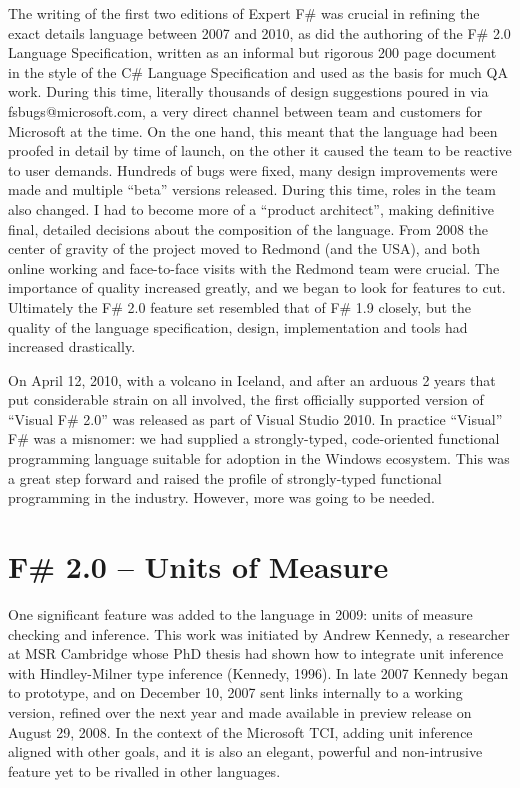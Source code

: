 \documentclass[acmsmall,review]{acmart}\settopmatter{printfolios=true,printccs=false,printacmref=false}
\begin{document}
The writing of the first two editions of Expert F\# was crucial in refining the exact details language between 2007 and 2010, as did the authoring of the F\# 2.0 Language Specification, written as an informal but rigorous 200 page document in the style of the C\# Language Specification and used as the basis for much QA work.   During this time, literally thousands of design suggestions poured in via fsbugs@microsoft.com, a very direct channel between team and customers for Microsoft at the time. On the one hand, this meant that the language had been proofed in detail by time of launch, on the other it caused the team to be reactive to user demands.  Hundreds of bugs were fixed, many design improvements were made and multiple “beta” versions released.  During this time, roles in the team also changed.  I had to become more of a “product architect”, making definitive final, detailed decisions about the composition of the language.  From 2008 the center of gravity of the project moved to Redmond (and the USA), and both online working and face-to-face visits with the Redmond team were crucial.  The importance of quality increased greatly, and we began to look for features to cut.  Ultimately the F\# 2.0 feature set resembled that of F\# 1.9 closely, but the quality of the language specification, design, implementation and tools had increased drastically.

On April 12, 2010, with a volcano in Iceland, and after an arduous 2 years that put considerable strain on all involved, the first officially supported version of “Visual F\# 2.0” was released as part of Visual Studio 2010.  In practice “Visual” F\# was a misnomer: we had supplied a strongly-typed, code-oriented functional programming language suitable for adoption in the Windows ecosystem.  This was a great step forward and raised the profile of strongly-typed functional programming in the industry. However, more was going to be needed. 



\section*{F\# 2.0 – Units of Measure }

One significant feature was added to the language in 2009: units of measure checking and inference.  This work was initiated by Andrew Kennedy, a researcher at MSR Cambridge whose PhD thesis had shown how to integrate unit inference with Hindley-Milner type inference (Kennedy, 1996). In late 2007 Kennedy began to prototype, and on December 10, 2007 sent links internally to a working version, refined over the next year and made available in preview release on August 29, 2008.   In the context of the Microsoft TCI, adding unit inference aligned with other goals, and it is also an elegant, powerful and non-intrusive feature yet to be rivalled in other languages.
\end{document}
